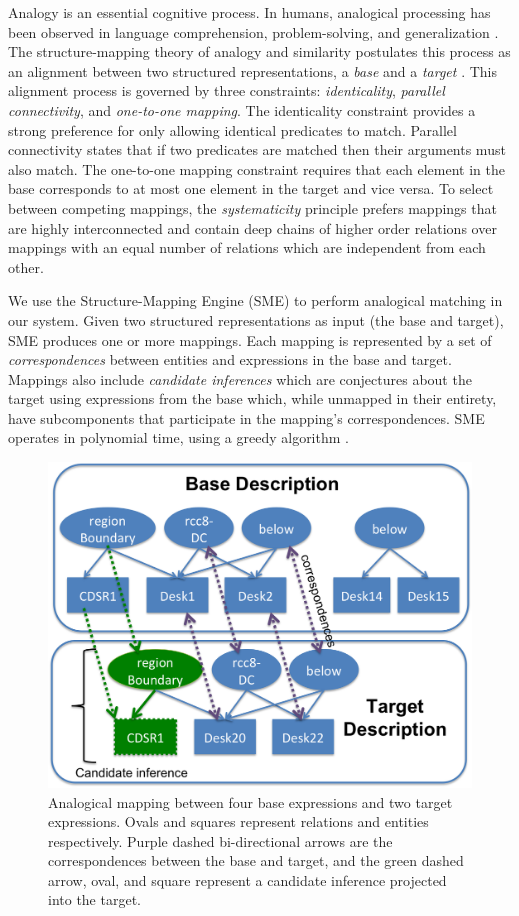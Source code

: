 \documentclass[letterpaper]{article}
\begin{document}
Analogy is an essential cognitive process. In humans, analogical processing has been observed in language comprehension, problem-solving, and generalization \cite{Gentner2003}. The structure-mapping theory of analogy and similarity postulates this process as an alignment between two structured representations, a \textit{base} and a \textit{target} \cite{Gentner1983a}. This alignment process is governed by three constraints: \textit{identicality}, \textit{parallel connectivity}, and \textit{one-to-one mapping}. The identicality constraint provides a strong preference for only allowing identical predicates to match. Parallel connectivity states that if two predicates are matched then their arguments must also match. The one-to-one mapping constraint requires that each element in the base corresponds to at most one element in the target and vice versa. To select between competing mappings, the \textit{systematicity} principle prefers mappings that are highly interconnected and contain deep chains of higher order relations over mappings with an equal number of relations which are independent from each other.

We use the Structure-Mapping Engine (SME) \cite{Falkenhainer1989a} to perform analogical matching in our system. Given two structured representations as input (the base and target), SME produces one or more mappings. Each mapping is represented by a set of \textit{correspondences} between entities and expressions in the base and target.  Mappings also include \textit{candidate inferences} which are conjectures about the target using expressions from the base which, while unmapped in their entirety, have subcomponents that participate in the mapping's correspondences. SME operates in polynomial time, using a greedy algorithm \cite{Forbus/etal1994}.

\begin{figure}[h]
  \includegraphics[width=\columnwidth]{analogy2.png}
  \caption{Analogical mapping between four base expressions and two target expressions. Ovals and squares represent relations and entities respectively. Purple dashed bi-directional arrows are the correspondences between the base and target, and the green dashed arrow, oval, and square represent a candidate inference projected into the target.}
  \label{fig:analogy}
\end{figure}
\end{document}
